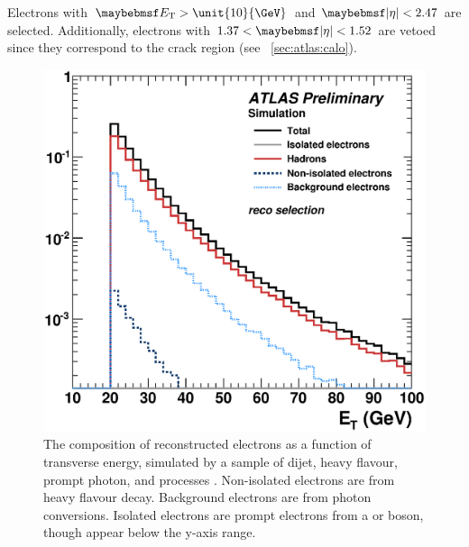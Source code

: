 Electrons with $\et > \unit{10}{\GeV}$ and $\mods{\eta} < 2.47$ are selected. Additionally, electrons with $1.37 < \mods{\eta} < 1.52$ are vetoed since they correspond
to the crack region (see \Section~\ref{sec:atlas:calo}).

\begin{figure}[t]
	\includegraphics[width=\smallfigwidth]{tex/selection/electron_composition}
	\caption{The composition of reconstructed electrons as a function of transverse 
	energy, simulated by a  sample of dijet, heavy flavour, prompt photon, \PW 
	and \PZ processes \cite{ElectronPerf:Expect}. Non-isolated electrons are from heavy 
	flavour decay. Background electrons are from photon conversions. Isolated electrons 
	are prompt electrons from a \PW or \PZ boson, though appear below the y-axis range.}
	\label{fig:objects:el_composition}
\end{figure}


